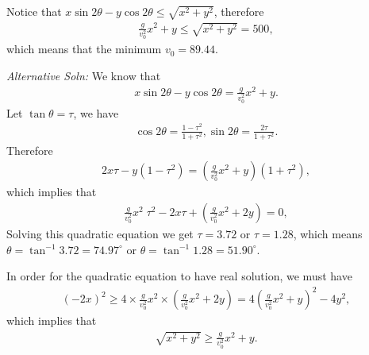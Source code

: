 \documentclass{article}
\begin{document}
\begin{enumerate}
Notice that $x\sin 2\theta - y \cos 2\theta \leq \sqrt{x^2+y^2}$, therefore
\begin{align*}
 \frac{g}{v_0^2}x^2 + y \leq \sqrt{x^2+y^2} = 500, 
\end{align*}
which means that the minimum $v_0 = 89.44$.

\emph{Alternative Soln:} We know that
\begin{align*}
    x \sin 2\theta - y\cos 2\theta = \frac{g}{v_0^2}x^2 + y.
\end{align*}
Let $\tan \theta = \tau$, we have
\begin{align*}
  \cos 2\theta = \frac{1-\tau^2}{1+\tau^2}, \sin 2\theta = \frac{2\tau}{1+\tau^2}.
\end{align*}
Therefore
\begin{align*}
 2x \tau - y(1-\tau^2) = \left(\frac{g}{v_0^2}x^2+y\right) (1+\tau^2),
\end{align*}
which implies that
\begin{align*}
  \frac{g}{v_0^2}x^2\; \tau^2 -2x\tau + \left(\frac{g}{v_0^2}x^2+2y\right) = 0,
\end{align*}
Solving this quadratic equation we get $\tau = 3.72$ or $\tau = 1.28$, which means $\theta = \tan^{-1} 3.72 = 74.97^\circ$ or $\theta = \tan^{-1}1.28 = 51.90^\circ$.

In order for the quadratic equation to have real solution, we must have
\begin{align*}
 (-2x) ^2 \geq 4 \times \frac{g}{v_0^2}x^2 \times \left(\frac{g}{v_0^2}x^2+2y\right) = 4\left(\frac{g}{v_0^2}x^2+y\right)^2-4y^2,
\end{align*}
which implies that
\begin{align*}
 \sqrt{ x^2+y^2 }\geq \frac{g}{v_0^2}x^2+y.
\end{align*}



\end{enumerate}
\end{document}
